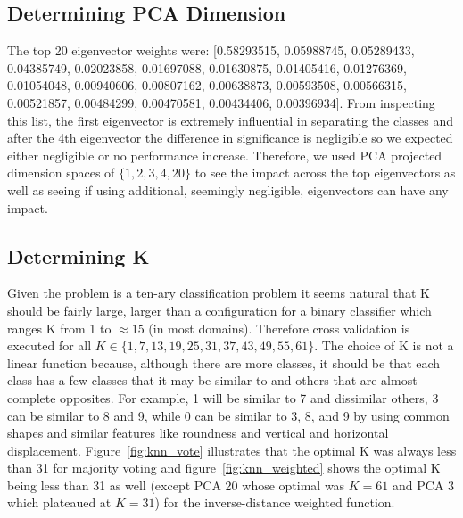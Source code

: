 \documentclass{article} %
\begin{document}
\subsection{Determining PCA Dimension} \label{knn_pca}
The top 20 eigenvector weights were: [0.58293515, 0.05988745, 0.05289433, 0.04385749, 0.02023858, 0.01697088, 0.01630875, 0.01405416, 0.01276369, 0.01054048, 0.00940606, 0.00807162, 0.00638873, 0.00593508, 0.00566315, 0.00521857, 0.00484299, 0.00470581, 0.00434406, 0.00396934].  From inspecting this list, the first eigenvector is extremely influential in separating the classes and after the 4th eigenvector the difference in significance is negligible so we expected either negligible or no performance increase.  Therefore, we used PCA projected dimension spaces of $\{1, 2, 3, 4, 20\}$ to see the impact across the top eigenvectors as well as seeing if using additional, seemingly negligible, eigenvectors can have any impact.

\subsection{Determining K} \label{knn_k}
Given the problem is a ten-ary classification problem it seems natural that K should be fairly large, larger than a configuration for a binary classifier which ranges K from 1 to $\approx 15$ (in most domains).  Therefore cross validation is executed for all $K \in \{1, 7, 13, 19, 25, 31, 37, 43, 49, 55, 61\}$.  The choice of K is not a linear function because, although there are more classes, it should be that each class has a few classes that it may be similar to and others that are almost complete opposites.  For example, 1 will be similar to 7 and dissimilar others, 3 can be similar to 8 and 9, while 0 can be similar to 3, 8, and 9 by using common shapes and similar features like roundness and vertical and horizontal displacement.  Figure~\ref{fig:knn_vote} illustrates that the optimal K was always less than 31 for majority voting and figure~\ref{fig:knn_weighted} shows the optimal K being less than 31 as well (except PCA 20 whose optimal was $K=61$ and PCA 3 which plateaued at $K=31$) for the inverse-distance weighted function.
\end{document}
